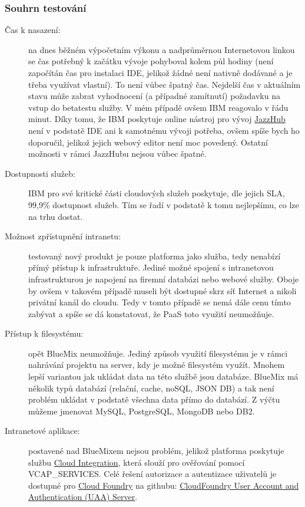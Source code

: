 \subsubsection{Souhrn testování}
\begin{description}
	\item [Čas k nasazení:] na dnes běžném výpočetním výkonu a nadprůměrnou Internetovou linkou se čas potřebný k začátku vývoje pohyboval kolem půl hodiny (není započítán čas pro instalaci IDE, jelikož žádné není nativně dodávané a je třeba využívat vlastní). To není vůbec špatný čas. Nejdelší čas v aktuálním stavu může zabrat vyhodnocení (a případné zamítnutí) požadavku na vstup do betatestu služby. V mém případě ovšem IBM reagovalo v řádu minut. Díky tomu, že IBM poskytuje online nástroj pro vývoj \href{https://hub.jazz.net}{JazzHub} není v podstatě IDE ani k samotnému vývoji potřeba, ovšem spíše bych ho doporučil, jelikož jejich webový editor není moc povedený. Ostatní možnosti v rámci JazzHubu nejsou vůbec špatné.
	\item [Dostupnosti služeb:] IBM pro své kritické části cloudových služeb poskytuje, dle jejich SLA, 99,9\% dostupnost služeb. Tím se řadí v podstatě k tomu nejlepšímu, co lze na trhu dostat.
	\item [Možnost zpřístupnění intranetu:] testovaný nový produkt je pouze platforma jako služba, tedy nenabízí přímý přístup k infrastruktuře. Jediné možné spojení s intranetovou infrastrukturou je napojení na firemní databázi nebo webové služby. Oboje by ovšem v takovém případě museli být dostupné skrz síť Internet a nikoli privátní kanál do cloudu. Tedy v tomto případě se nemá dále cenu tímto zabývat a spíše se dá konstatovat, že PaaS toto využití neumožňuje.
	\item [Přístup k filesystému:] opět BlueMix neumožňuje. Jediný způsob využití filesystému je v rámci nahrávání projektu na server, kdy je možné filesystém využít. Mnohem lepší variantou jak ukládat data na této službě jsou databáze. BlueMix má několik typů databází (relační, cache, noSQL, JSON DB) a tak není problém ukládat v podstatě všechna data přímo do databází. Z výčtu můžeme jmenovat MySQL, PostgreSQL, MongoDB nebo DB2.
	\item [Intranetové aplikace:] postavené nad BlueMixem nejsou problém, jelikož platforma poskytuje službu \href{http://www.ng.bluemix.net/docs/Services/CloudIntegration/CloudIntegration.html}{Cloud Integration}, která slouží pro ověřování pomocí VCAP\_SERVICES. Celé řešení autorizace a autentizace uživatelů je dostupné pro \href{http://www.cloudfoundry.org}{Cloud Foundry} na githubu: \href{https://github.com/cloudfoundry/uaa}{CloudFoundry User Account and Authentication (UAA) Server}.

\end{description}
